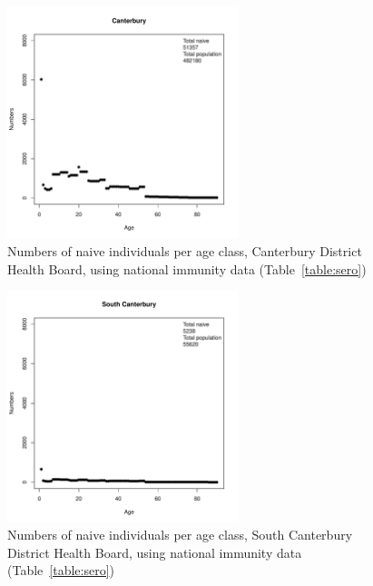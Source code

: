 \documentclass{article}
\begin{document}
\begin{figure}[H]
   \begin{center}
     \includegraphics[width=0.6\textwidth]{dhb18.pdf}
     \end{center}
     \caption{Numbers of naive individuals per age class, Canterbury District Health Board, using national immunity data (Table~\ref{table:sero})}
     \label{fig:Canterbury}
\end{figure}

\begin{figure}[H]
     \begin{center}
     \includegraphics[width=0.6\textwidth]{dhb19.pdf}
     \end{center}
     \caption{Numbers of naive individuals per age class, South Canterbury District Health Board, using national immunity data (Table~\ref{table:sero})}
     \label{fig:SouthCanterbury}
\end{figure}
\end{document}
